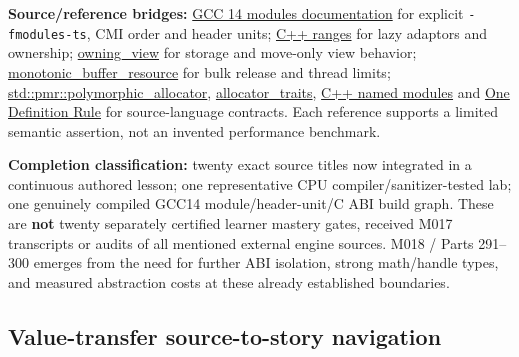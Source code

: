 \textbf{Source/reference bridges:} \href{https://gcc.gnu.org/onlinedocs/gcc-14.3.0/gcc/C_002b_002b-Modules.html}{GCC 14 modules documentation} for explicit \texttt{-fmodules-ts}, CMI order and header units; \href{https://en.cppreference.com/cpp/ranges}{C++ ranges} for lazy adaptors and ownership; \href{https://en.cppreference.com/cpp/ranges/owning_view}{owning\_view} for storage and move-only view behavior; \href{https://en.cppreference.com/cpp/memory/monotonic_buffer_resource}{monotonic\_buffer\_resource} for bulk release and thread limits; \href{https://en.cppreference.com/w/cpp/memory/polymorphic_allocator}{std::pmr::polymorphic\_allocator}, \href{https://en.cppreference.com/w/cpp/memory/allocator_traits}{allocator\_traits}, \href{https://en.cppreference.com/w/cpp/language/modules}{C++ named modules} and \href{https://en.cppreference.com/w/cpp/language/definition}{One Definition Rule} for source-language contracts. Each reference supports a limited semantic assertion, not an invented performance benchmark.

\textbf{Completion classification:} twenty exact source titles now integrated in a continuous authored lesson; one representative CPU compiler/sanitizer-tested lab; one genuinely compiled GCC14 module/header-unit/C ABI build graph. These are \textbf{not} twenty separately certified learner mastery gates, received M017 transcripts or audits of all mentioned external engine sources. M018 / Parts 291--300 emerges from the need for further ABI isolation, strong math/handle types, and measured abstraction costs at these already established boundaries.

\subsection{Value-transfer source-to-story navigation}\label{appendix-fd090d982a15-value-transfer-source-to-story-navigation}

